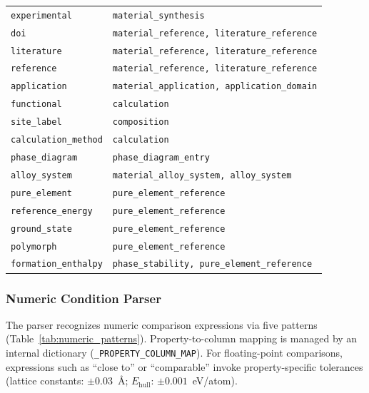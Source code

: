\begin{footnotesize}
\begin{longtable}{ll}
    \texttt{experimental} & \texttt{material\_synthesis} \\
    \texttt{doi} & \texttt{material\_reference, literature\_reference} \\
    \texttt{literature} & \texttt{material\_reference, literature\_reference} \\
    \texttt{reference} & \texttt{material\_reference, literature\_reference} \\
    \texttt{application} & \texttt{material\_application, application\_domain} \\
    \texttt{functional} & \texttt{calculation} \\
    \texttt{site\_label} & \texttt{composition} \\
    \texttt{calculation\_method} & \texttt{calculation} \\
    \texttt{phase\_diagram} & \texttt{phase\_diagram\_entry} \\
    \texttt{alloy\_system} & \texttt{material\_alloy\_system, alloy\_system} \\
    \texttt{pure\_element} & \texttt{pure\_element\_reference} \\
    \texttt{reference\_energy} & \texttt{pure\_element\_reference} \\
    \texttt{ground\_state} & \texttt{pure\_element\_reference} \\
    \texttt{polymorph} & \texttt{pure\_element\_reference} \\
    \texttt{formation\_enthalpy} & \texttt{phase\_stability, pure\_element\_reference} \\
\end{longtable}
\end{footnotesize}


\subsubsection{Numeric Condition Parser}

The parser recognizes numeric comparison expressions via five patterns (Table~\ref{tab:numeric_patterns}). Property-to-column mapping is managed by an internal dictionary (\texttt{\_PROPERTY\_COLUMN\_MAP}). For floating-point comparisons, expressions such as ``close to'' or ``comparable'' invoke property-specific tolerances (lattice constants: $\pm 0.03$~\AA{}{}; $E_\text{hull}$: $\pm 0.001$~eV/atom).

